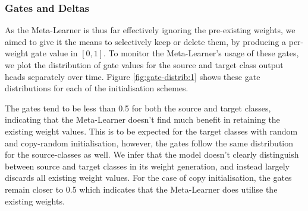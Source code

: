 \documentclass{report}
\begin{document}
\subsubsection{Gates and Deltas}
As the Meta-Learner is thus far effectively ignoring the pre-existing weights, we aimed to give it the means to selectively keep or delete them, by producing a per-weight gate value in $[0, 1]$. To monitor the Meta-Learner's usage of these gates, we plot the distribution of gate values for the source and target class output heads separately over time. Figure \ref{fig:gate-distrib:1} shows these gate distributions for each of the initialisation schemes. \par
The gates tend to be less than 0.5 for both the source and target classes, indicating that the Meta-Learner doesn't find much benefit in retaining the existing weight values. This is to be expected for the target classes with random and copy-random initialisation, however, the gates follow the same distribution for the source-classes as well. We infer that the model doesn't clearly distinguish between source and target classes in its weight generation, and instead largely discards all existing weight values. For the case of copy initialisation, the gates remain closer to 0.5 which indicates that the Meta-Learner does utilise the existing weights. \par
\end{document}

